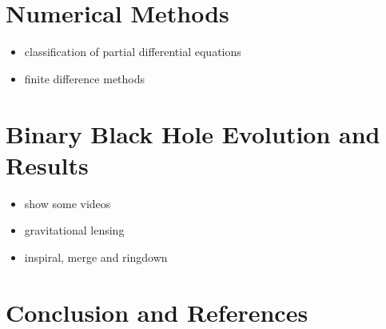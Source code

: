 \documentclass[twocolumn]{article}
\begin{document}
  \section{Numerical Methods} %
  \label{sec:numerical_methods}
    \begin{itemize}
      \item classification of partial differential equations
      \item finite difference methods
    \end{itemize}

  \section{Binary Black Hole Evolution and Results} %
  \label{sec:binary_black_hole_evolution_and_results}
    \begin{itemize}
      \item show some videos
      \item gravitational lensing
      \item inspiral, merge and ringdown
    \end{itemize}

  \section{Conclusion and References} %
  \label{sec:references}

\end{document}
